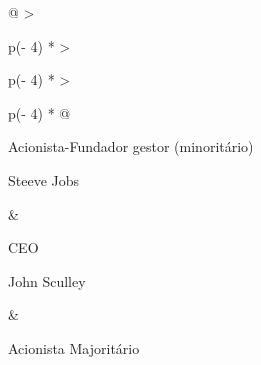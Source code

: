 \documentclass[
]{book}
\begin{document}
\begin{longtable}[]{@{}
  >{\raggedright\arraybackslash}p{(\columnwidth - 4\tabcolsep) * }
  >{\raggedright\arraybackslash}p{(\columnwidth - 4\tabcolsep) * }
  >{\raggedright\arraybackslash}p{(\columnwidth - 4\tabcolsep) * }@{}}
\toprule\noalign{}
\begin{minipage}[b]{\linewidth}\raggedright
Acionista-Fundador gestor (minoritário)

Steeve Jobs
\end{minipage} & \begin{minipage}[b]{\linewidth}\raggedright
CEO

John Sculley
\end{minipage} & \begin{minipage}[b]{\linewidth}\raggedright
Acionista Majoritário


\end{minipage}
\end{longtable}
\end{document}
